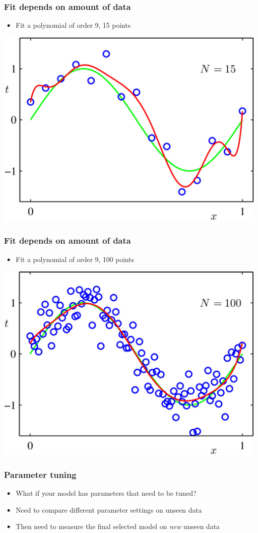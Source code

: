 \documentclass[12pt,notes,mathserif]{beamer}
\begin{document}
\begin{frame}[c]
\frametitle{Fit depends on amount of data}
\begin{itemize}
\item  Fit a polynomial of order 9, 15 points
\end{itemize}
\begin{center}
\includegraphics[width=0.61\linewidth]{fig/lec511.jpg}
\end{center}
\end{frame}

\begin{frame}[c]
\frametitle{Fit depends on amount of data}
\begin{itemize}
\item  Fit a polynomial of order 9, 100 points
\end{itemize}
\begin{center}
\includegraphics[width=0.61\linewidth]{fig/lec512.jpg}
\end{center}
\end{frame}

\begin{frame}[c]
\frametitle{Parameter tuning}
\begin{itemize}
\item  What if your model has parameters that need to be tuned?
\item  Need to compare different parameter settings on unseen data
\item  Then need to measure the final selected model on \textit{new} unseen data
\end{itemize}
\end{frame}
\end{document}
